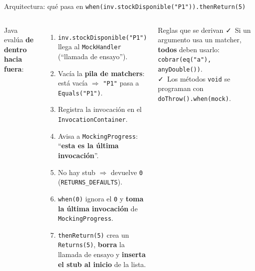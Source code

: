 \documentclass[aspectratio=169,10pt]{beamer}
\newcommand{\code}[1]{\texttt{#1}}
\begin{document}
\begin{frame}{Arquitectura: qué pasa en \code{when(inv.stockDisponible("P1")).thenReturn(5)}}
\begin{columns}[c]
\small Java evalúa \textbf{de dentro hacia fuera}:
\begin{enumerate}\scriptsize
  \item \code{inv.stockDisponible("P1")} llega al \code{MockHandler} (``llamada de ensayo'').
  \item Vacía la \textbf{pila de matchers}: está vacía $\Rightarrow$ \code{"P1"} pasa a \code{Equals("P1")}.
  \item Registra la invocación en el \code{InvocationContainer}.
  \item Avisa a \code{MockingProgress}: ``\textbf{esta es la última invocación}''.
  \item No hay stub $\Rightarrow$ devuelve \code{0} (\code{RETURNS\_DEFAULTS}).
  \item \code{when(0)} ignora el \code{0} y \textbf{toma la última invocación} de \code{MockingProgress}.
  \item \code{thenReturn(5)} crea un \code{Returns(5)}, \textbf{borra} la llamada de ensayo y \textbf{inserta el stub al inicio} de la lista.
\end{enumerate}
\centering
{}

\vspace{0.2cm}
\begin{exampleblock}{Reglas que se derivan}
\tiny \faCheck\ Si un argumento usa un matcher, \textbf{todos} deben usarlo: \code{cobrar(eq("a"), anyDouble())}.\\
\faCheck\ Los métodos \code{void} se programan con \code{doThrow().when(mock)}.
\end{exampleblock}
\end{columns}
\end{frame}
\end{document}
